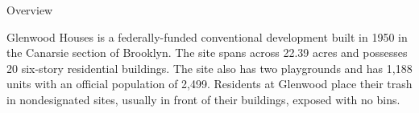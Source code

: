Overview

Glenwood Houses is a federally-funded conventional development built in 1950 in the Canarsie section of Brooklyn. The site spans across 22.39 acres and possesses 20 six-story residential buildings. The site also has two playgrounds and has 1,188 units with an official population of 2,499. Residents at Glenwood place their trash in nondesignated sites, usually in front of their buildings, exposed with no bins. 